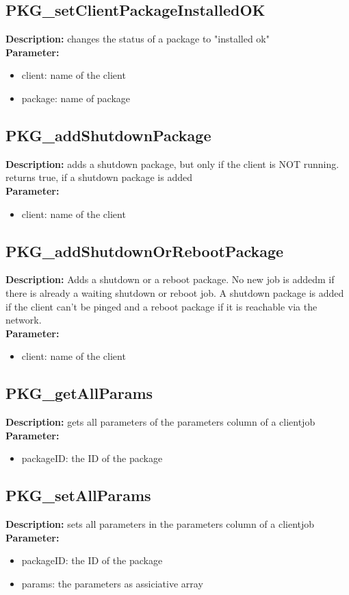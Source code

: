 \subsection{PKG\_setClientPackageInstalledOK}
\textbf{Description:} changes the status of a package to "installed ok"\\
\textbf{Parameter:}
\begin{itemize}
\item client: name of the client
\item package: name of package
\end{itemize}

\subsection{PKG\_addShutdownPackage}
\textbf{Description:} adds a shutdown package, but only if the client is NOT running. returns true, if a shutdown package is added\\
\textbf{Parameter:}
\begin{itemize}
\item client: name of the client
\end{itemize}

\subsection{PKG\_addShutdownOrRebootPackage}
\textbf{Description:} Adds a shutdown or a reboot package. No new job is addedm if there is already a waiting shutdown or reboot job. A shutdown package is added if the client can't be pinged and a reboot package if it is reachable via the network.\\
\textbf{Parameter:}
\begin{itemize}
\item client: name of the client
\end{itemize}

\subsection{PKG\_getAllParams}
\textbf{Description:} gets all parameters of the parameters column of a clientjob\\
\textbf{Parameter:}
\begin{itemize}
\item packageID: the ID of the package
\end{itemize}

\subsection{PKG\_setAllParams}
\textbf{Description:} sets all parameters in the parameters column of a clientjob\\
\textbf{Parameter:}
\begin{itemize}
\item packageID: the ID of the package
\item params: the parameters as assiciative array
\end{itemize}

